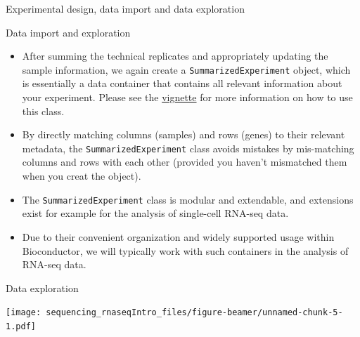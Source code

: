 \documentclass[ignorenonframetext,]{beamer}
\newenvironment{Shaded}{\begin{snugshade}}{\end{snugshade}}
\newcommand{\CommentTok}[1]{\textcolor[rgb]{0.56,0.35,0.01}{\textit{#1}}}
\newcommand{\DataTypeTok}[1]{\textcolor[rgb]{0.13,0.29,0.53}{#1}}
\newcommand{\DecValTok}[1]{\textcolor[rgb]{0.00,0.00,0.81}{#1}}
\newcommand{\FloatTok}[1]{\textcolor[rgb]{0.00,0.00,0.81}{#1}}
\newcommand{\KeywordTok}[1]{\textcolor[rgb]{0.13,0.29,0.53}{\textbf{#1}}}
\newcommand{\NormalTok}[1]{#1}
\newcommand{\OperatorTok}[1]{\textcolor[rgb]{0.81,0.36,0.00}{\textbf{#1}}}
\newcommand{\StringTok}[1]{\textcolor[rgb]{0.31,0.60,0.02}{#1}}
\providecommand{\tightlist}{%
  \setlength{\itemsep}{0pt}\setlength{\parskip}{0pt}}
\begin{document}
\begin{frame}[fragile]{Experimental design, data import and data
exploration}
\begin{block}{Data import and exploration}
\begin{itemize}
\tightlist
\item
  After summing the technical replicates and appropriately updating the
  sample information, we again create a \texttt{SummarizedExperiment}
  object, which is essentially a data container that contains all
  relevant information about your experiment. Please see the
  \href{https://bioconductor.org/packages/release/bioc/vignettes/SummarizedExperiment/inst/doc/SummarizedExperiment.html}{vignette}
  for more information on how to use this class.
\item
  By directly matching columns (samples) and rows (genes) to their
  relevant metadata, the \texttt{SummarizedExperiment} class avoids
  mistakes by mis-matching columns and rows with each other (provided
  you haven't mismatched them when you creat the object).
\item
  The \texttt{SummarizedExperiment} class is modular and extendable, and
  extensions exist for example for the analysis of single-cell RNA-seq
  data.
\item
  Due to their convenient organization and widely supported usage within
  Bioconductor, we will typically work with such containers in the
  analysis of RNA-seq data.
\end{itemize}

\end{block}

\begin{block}{Data exploration}

\begin{Shaded}
\end{Shaded}

\texttt{[image: sequencing\_rnaseqIntro\_files/figure-beamer/unnamed-chunk-5-1.pdf]}

\begin{Shaded}
\end{Shaded}


\end{block}
\end{frame}
\end{document}
